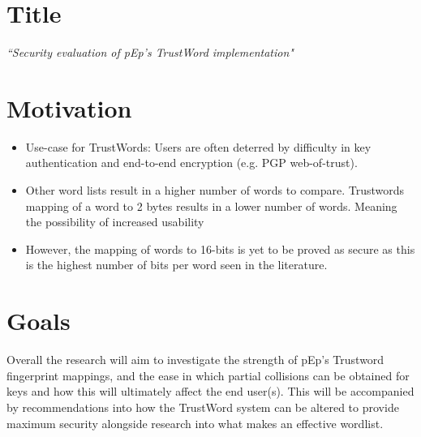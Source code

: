 \section{Title}

\begin{center}
    \textit{\large ``Security evaluation of pEp's TrustWord implementation"}
\end{center}

\section{Motivation}
\begin{itemize}
    \item Use-case for TrustWords: Users are often deterred by difficulty in key authentication and end-to-end encryption (e.g. PGP web-of-trust).

    \item Other word lists result in a higher number of words to compare. Trustwords mapping of a word to 2 bytes results in a lower number of words. Meaning the possibility of increased usability

    \item However, the mapping of words to 16-bits is yet to be proved as secure as this is the highest number of bits per word seen in the literature.
    
\end{itemize}

\section{Goals}

Overall the research will aim to investigate the strength of pEp's Trustword fingerprint mappings, and the ease in which partial collisions can be obtained for keys and how this will ultimately affect the end user(s). This will be accompanied by recommendations into how the TrustWord system can be altered to provide maximum security alongside research into what makes an effective wordlist.

\newpage
